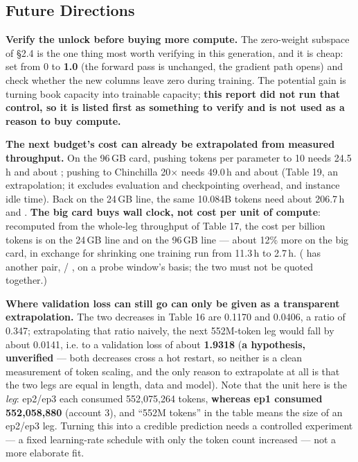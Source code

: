\documentclass[11pt,openany]{article}
\begin{document}
\subsection{Future Directions}

\textbf{Verify the unlock before buying more compute.} The zero-weight subspace of \S2.4 is the one
thing most worth verifying in this generation, and it is cheap: set  from 0 to
\textbf{1.0} (the forward pass is unchanged, the gradient path opens) and check whether the new
columns leave zero during training. The potential gain is turning book capacity into trainable
capacity; \textbf{this report did not run that control, so it is listed first as something to
verify and is not used as a reason to buy compute.}

\textbf{The next budget's cost can already be extrapolated from measured throughput.} On the
96\,GB card, pushing tokens per parameter to 10 needs 24.5\,h and about ; pushing to
Chinchilla 20$\times$ needs 49.0\,h and about  (Table 19, an extrapolation; it
excludes evaluation and checkpointing overhead, and instance idle time). Back on the 24\,GB line,
the same 10.084B tokens need about 206.7\,h and . \textbf{The big card buys wall clock,
not cost per unit of compute}: recomputed from the whole-leg throughput of Table 17, the cost per
billion tokens is \textbf{} on the 24\,GB line and \textbf{} on the
96\,GB line --- about 12\% more on the big card, in exchange for shrinking one training run from
11.3\,h to 2.7\,h. ( has another pair,  / , on a probe
window's basis; the two must not be quoted together.)

\textbf{Where validation loss can still go can only be given as a transparent extrapolation.} The
two decreases in Table 16 are 0.1170 and 0.0406, a ratio of 0.347; extrapolating that ratio
naively, the next 552M-token leg would fall by about 0.0141, i.e. to a validation loss of about
\textbf{1.9318} (\textbf{a hypothesis, unverified} --- both decreases cross a hot restart, so
neither is a clean measurement of token scaling, and the only reason to extrapolate at all is that
the two legs are equal in length, data and model). Note that the unit here is the \emph{leg}:
ep2/ep3 each consumed 552{,}075{,}264 tokens, \textbf{whereas ep1 consumed 552{,}058{,}880}
(account 3), and ``552M tokens'' in the table means the size of an ep2/ep3 leg. Turning this into
a credible prediction needs a controlled experiment --- a fixed learning-rate schedule with only
the token count increased --- not a more elaborate fit.
\end{document}
